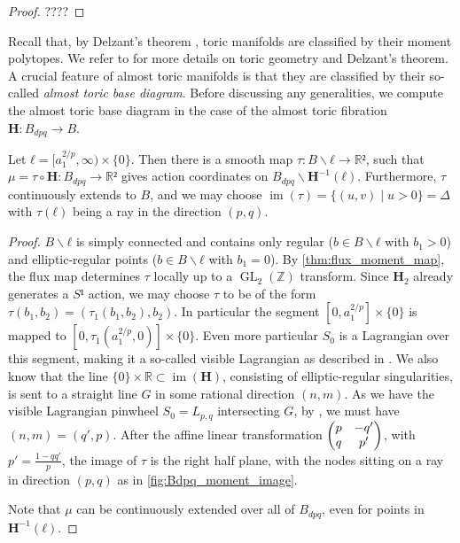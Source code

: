 \documentclass[12pt,a4paper,draft]{scrartcl}
\DeclareMathOperator{\im}{im}
\DeclareMathOperator{\GL}{GL}
\begin{document}
\begin{proof}
    ????
\end{proof}

Recall that, by Delzant's theorem \cite{Del88}, toric manifolds are classified by their moment polytopes. We refer to \cite{Can03,Gui94} for more details on toric geometry and Delzant's theorem. A crucial feature of almost toric manifolds is that they are classified by their so-called \emph{almost toric base diagram}. Before discussing any generalities, we compute the almost toric base diagram in the case of the almost toric fibration $\mathbf{H} \colon B_{dpq} \rightarrow B$. 





\begin{lemma}
  \label{thm:bdpq_moment_map}
  Let $ℓ = [a_1^{2/p},∞) × \{0\}$.
  Then there is a smooth map $τ: B ∖ ℓ → ℝ²$, such that $μ = τ ∘ \symbf{H} \colon B_{dpq} → ℝ²$ gives action coordinates on $B_{dpq} ∖ \symbf{H}^{-1}(ℓ)$.
  Furthermore, $τ$ continuously extends to $B$, and we may choose $\im(τ)=\{(u,v) \mid u>0\} = Δ$ with $τ(ℓ)$ being a ray in the direction $(p,q)$.
\end{lemma}


\begin{proof}
  $B ∖ ℓ$ is simply connected and contains only regular ($b ∈ B ∖ ℓ$ with $b_1>0$) and elliptic-regular points ($b ∈ B ∖ ℓ$ with $b_1 = 0$).
By \cref{thm:flux_moment_map}, the flux map determines $τ$ locally up to a $\GL_2(ℤ)$ transform.
Since $\symbf{H}_2$ already generates a $S¹$ action, we may choose $τ$ to be of the form $τ(b_1,b_2) = (τ_1(b_1,b_2), b_2)$.
In particular the segment $[0,a_1^{2/p}] × \{0\}$ is mapped to $[0,τ_1(a_1^{2/p},0)] × \{0\}$. Even more particular $S_0$ is a Lagrangian over this segment, making it a so-called visible Lagrangian as described in \cite[Chapter 5]{evans2021atfs}.
We also know that the line $\{0\} × ℝ ⊂ \im(\symbf{H})$, consisting of elliptic-regular singularities, is sent to a straight line $G$ in some rational direction $(n,m)$.
As we have the visible Lagrangian pinwheel $S_0 = L_{p,q}$ intersecting $G$, by \cite[Section 5.3]{evans2021atfs}, we must have $(n,m) = (q',p)$.
After the affine linear transformation $\mqty(p & -q'\\q & p')$, with $p' = \frac{1-qq'}{p}$, the image of $τ$ is the right half plane, with the nodes sitting on a ray in direction $(p,q)$ as in \cref{fig:Bdpq_moment_image}.

Note that $μ$ can be continuously extended over all of $B_{dpq}$, even for points in $\symbf{H}^{-1}(ℓ)$. 
\end{proof}
\end{document}

